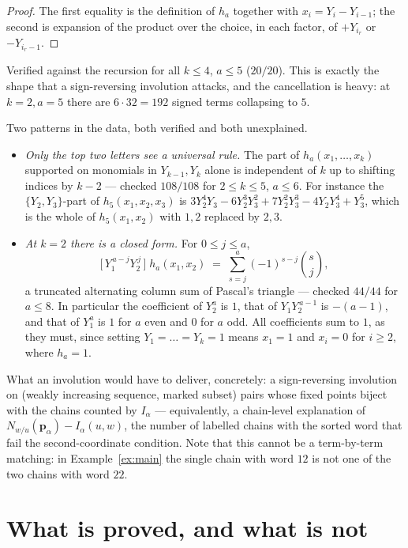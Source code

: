 \documentclass[11pt]{article}
\theoremstyle{plain}
\theoremstyle{definition}
\newcommand{\pv}{\mathbf{p}}
\begin{document}
\begin{proof}
The first equality is the definition of $h_a$ together with $x_i=Y_i-Y_{i-1}$;
the second is expansion of the product over the choice, in each factor, of
$+Y_{i_r}$ or $-Y_{i_r-1}$.
\end{proof}

\noindent Verified against the recursion for all $k\le4$, $a\le5$ ($20/20$). This is
exactly the shape that a sign-reversing involution attacks, and the cancellation
is heavy: at $k=2,a=5$ there are $6\cdot32=192$ signed terms collapsing to $5$.

Two patterns in the data, both verified and both unexplained.

\begin{itemize}
\item \emph{Only the top two letters see a universal rule.} The part of
$h_a(x_1,\dots,x_k)$ supported on monomials in $Y_{k-1},Y_k$ alone is
independent of $k$ up to shifting indices by $k-2$ --- checked $108/108$ for
$2\le k\le5$, $a\le6$. For instance the $\{Y_2,Y_3\}$-part of
$h_5(x_1,x_2,x_3)$ is $3Y_2^4Y_3-6Y_2^3Y_3^2+7Y_2^2Y_3^3-4Y_2Y_3^4+Y_3^5$,
which is the whole of $h_5(x_1,x_2)$ with $1,2$ replaced by $2,3$.
\item \emph{At $k=2$ there is a closed form.} For $0\le j\le a$,
\[
  \bigl[\,Y_1^{\,a-j}Y_2^{\,j}\,\bigr]\;h_a(x_1,x_2)
  \;=\;\sum_{s=j}^{a}(-1)^{s-j}\binom{s}{j},
\]
a truncated alternating column sum of Pascal's triangle --- checked $44/44$ for
$a\le8$. In particular the coefficient of $Y_2^a$ is $1$, that of
$Y_1Y_2^{\,a-1}$ is $-(a-1)$, and that of $Y_1^a$ is $1$ for $a$ even and $0$
for $a$ odd. All coefficients sum to $1$, as they must, since setting
$Y_1=\dots=Y_k=1$ means $x_1=1$ and $x_i=0$ for $i\ge2$, where $h_a=1$.
\end{itemize}

\noindent What an involution would have to deliver, concretely: a sign-reversing
involution on (weakly increasing sequence, marked subset) pairs whose fixed
points biject with the chains counted by $I_\alpha$ --- equivalently, a
chain-level explanation of
$N_{w/u}(\pv_\alpha)-I_\alpha(u,w)$, the number of labelled chains with the
sorted word that fail the second-coordinate condition. Note that this cannot be
a term-by-term matching: in Example~\ref{ex:main} the single chain with word
$12$ is not one of the two chains with word $22$.

\section{What is proved, and what is not}\label{sec:gaps}
\end{document}
